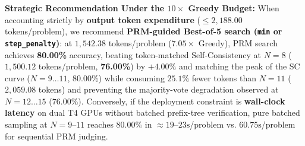 \documentclass[10pt,a4paper]{article}
\begin{document}
\begin{table}[h!]
\centering
\caption{Structural asymmetry and budget utilization under the $10\times$ Greedy output token budget ($2{,}188.00$ tok/problem).}
\label{tab:asymmetry}
\end{table}

\textbf{Strategic Recommendation Under the $10\times$ Greedy Budget:}
When accounting strictly by \textbf{output token expenditure} ($\le 2{,}188.00$ tokens/problem), we recommend \textbf{PRM-guided Best-of-5 search (\texttt{min} or \texttt{step\_penalty})}: at $1{,}542.38$ tokens/problem ($7.05\times$ Greedy), PRM search achieves \textbf{80.00\%} accuracy, beating token-matched Self-Consistency at $N=8$ ($1{,}500.12$ tokens/problem, \textbf{76.00\%}) by $+4.00\%$ and matching the peak of the SC curve ($N=9\dots 11$, $80.00\%$) while consuming $25.1\%$ fewer tokens than $N=11$ ($2{,}059.08$ tokens) and preventing the majority-vote degradation observed at $N=12\dots 15$ ($76.00\%$). Conversely, if the deployment constraint is \textbf{wall-clock latency} on dual T4 GPUs without batched prefix-tree verification, pure batched sampling at $N=9$--$11$ reaches $80.00\%$ in $\approx 19$--$23\text{s}$/problem vs. $60.75\text{s}$/problem for sequential PRM judging.
\end{document}
